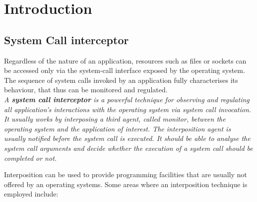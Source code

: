 \chapter{Introduction}

\section{System Call interceptor}


Regardless of the nature of an application, resources such as files or sockets can be accessed only via the system-call interface exposed by the operating system.
The sequence of system calls invoked by an application fully characterises its behaviour, that thus can be monitored and regulated. \\


\textit{A \textbf{system call interceptor} is a powerful technique for observing and regulating all application's interactions with the operating system via system call invocation. It usually works by interposing a third agent, called monitor, between the operating system and the application of interest. The interposition agent is usually notified before the system call is executed. It should be able to analyse the system call arguments and decide whether the execution of a system call should be completed or not.\\
}


Interposition can be used to provide programming facilities that are usually not offered by an operating systems. Some areas where an interposition technique is employed include:

